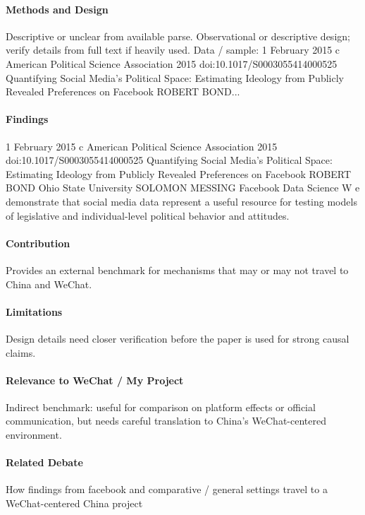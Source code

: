 \documentclass[12pt]{article}
\begin{document}
\paragraph{Methods and Design} Descriptive or unclear from available parse. Observational or descriptive design; verify details from full text if heavily used. Data / sample: 1 February 2015 c American Political Science Association 2015  doi:10.1017/S0003055414000525 Quantifying Social Media's Political Space: Estimating Ideology from Publicly Revealed Preferences on Facebook ROBERT BOND...

\paragraph{Findings} 1 February 2015 c American Political Science Association 2015  doi:10.1017/S0003055414000525 Quantifying Social Media's Political Space: Estimating Ideology from Publicly Revealed Preferences on Facebook ROBERT BOND Ohio State University SOLOMON MESSING Facebook Data Science W e demonstrate that social media data represent a useful resource for testing models of legislative and individual-level political behavior and attitudes.

\paragraph{Contribution} Provides an external benchmark for mechanisms that may or may not travel to China and WeChat.

\paragraph{Limitations} Design details need closer verification before the paper is used for strong causal claims.

\paragraph{Relevance to WeChat / My Project} Indirect benchmark: useful for comparison on platform effects or official communication, but needs careful translation to China's WeChat-centered environment.

\paragraph{Related Debate} How findings from facebook and comparative / general settings travel to a WeChat-centered China project
\end{document}
